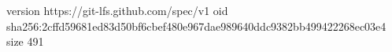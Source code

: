 version https://git-lfs.github.com/spec/v1
oid sha256:2cffd59681ed83d50bf6cbef480e967dae989640ddc9382bb499422268ec03e4
size 491
